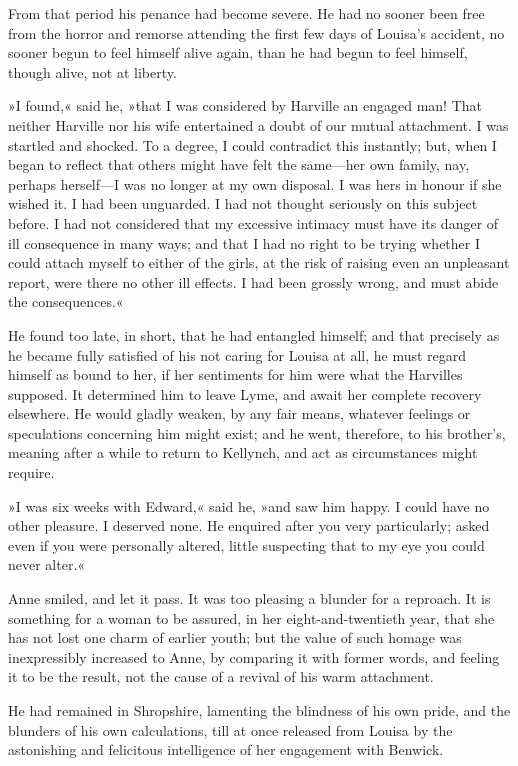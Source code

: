 From that period his penance had become severe. He had no sooner been free from the horror and remorse attending the first few days of Louisa's accident, no sooner begun to feel himself alive again, than he had begun to feel himself, though alive, not at liberty.

»I found,« said he, »that I was considered by Harville an engaged man! That neither Harville nor his wife entertained a doubt of our mutual attachment. I was startled and shocked. To a degree, I could contradict this instantly; but, when I began to reflect that others might have felt the same—her own family, nay, perhaps herself—I was no longer at my own disposal. I was hers in honour if she wished it. I had been unguarded. I had not thought seriously on this subject before. I had not considered that my excessive intimacy must have its danger of ill consequence in many ways; and that I had no right to be trying whether I could attach myself to either of the girls, at the risk of raising even an unpleasant report, were there no other ill effects. I had been grossly wrong, and must abide the consequences.«

He found too late, in short, that he had entangled himself; and that precisely as he became fully satisfied of his not caring for Louisa at all, he must regard himself as bound to her, if her sentiments for him were what the Harvilles supposed. It determined him to leave Lyme, and await her complete recovery elsewhere. He would gladly weaken, by any fair means, whatever feelings or speculations concerning him might exist; and he went, therefore, to his brother's, meaning after a while to return to Kellynch, and act as circumstances might require.

»I was six weeks with Edward,« said he, »and saw him happy. I could have no other pleasure. I deserved none. He enquired after you very particularly; asked even if you were personally altered, little suspecting that to my eye you could never alter.«

Anne smiled, and let it pass. It was too pleasing a blunder for a reproach. It is something for a woman to be assured, in her eight-and-twentieth year, that she has not lost one charm of earlier youth; but the value of such homage was inexpressibly increased to Anne, by comparing it with former words, and feeling it to be the result, not the cause of a revival of his warm attachment.

He had remained in Shropshire, lamenting the blindness of his own pride, and the blunders of his own calculations, till at once released from Louisa by the astonishing and felicitous intelligence of her engagement with Benwick.

